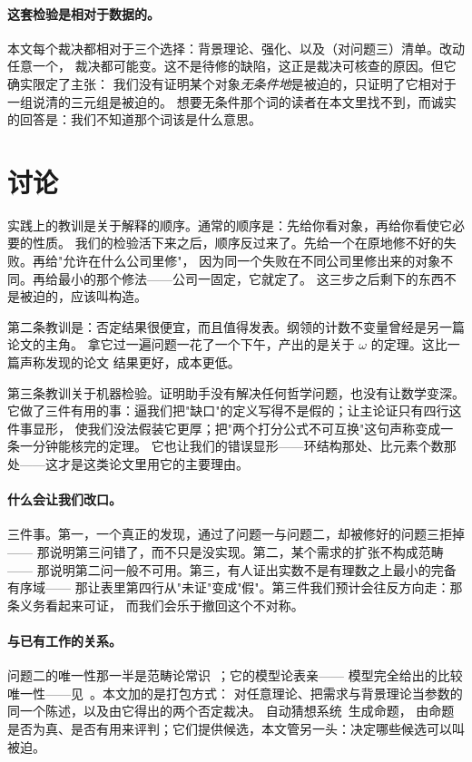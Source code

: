 \documentclass[aps,prd,preprint,superscriptaddress,amsmath,amssymb]{revtex4-2}
\begin{document}
\paragraph{这套检验是相对于数据的。}
本文每个裁决都相对于三个选择：背景理论、强化、以及（对问题三）清单。改动任意一个，
裁决都可能变。这不是待修的缺陷，这正是裁决可核查的原因。但它确实限定了主张：
我们没有证明某个对象\emph{无条件地}是被迫的，只证明了它相对于一组说清的三元组是被迫的。
想要无条件那个词的读者在本文里找不到，而诚实的回答是：我们不知道那个词该是什么意思。

\section{讨论}
\label{sec:discussion}

实践上的教训是关于解释的顺序。通常的顺序是：先给你看对象，再给你看使它必要的性质。
我们的检验活下来之后，顺序反过来了。先给一个在原地修不好的失败。再给"允许在什么公司里修"，
因为同一个失败在不同公司里修出来的对象不同。再给最小的那个修法——公司一固定，它就定了。
这三步之后剩下的东西不是被迫的，应该叫构造。

第二条教训是：否定结果很便宜，而且值得发表。纲领的计数不变量曾经是另一篇论文的主角。
拿它过一遍问题一花了一个下午，产出的是关于 $\omega$ 的定理。这比一篇声称发现的论文
结果更好，成本更低。

第三条教训关于机器检验。证明助手没有解决任何哲学问题，也没有让数学变深。
它做了三件有用的事：逼我们把"缺口"的定义写得不是假的；让主论证只有四行这件事显形，
使我们没法假装它更厚；把"两个打分公式不可互换"这句声称变成一条一分钟能核完的定理。
它也让我们的错误显形——环结构那处、比元素个数那处——这才是这类论文里用它的主要理由。

\paragraph{什么会让我们改口。}
三件事。第一，一个真正的发现，通过了问题一与问题二，却被修好的问题三拒掉——
那说明第三问错了，而不只是没实现。第二，某个需求的扩张不构成范畴——
那说明第二问一般不可用。第三，有人证出实数不是有理数之上最小的完备有序域——
那让表里第四行从"未证"变成"假"。第三件我们预计会往反方向走：那条义务看起来可证，
而我们会乐于撤回这个不对称。

\paragraph{与已有工作的关系。}
问题二的唯一性那一半是范畴论常识~\cite{MacLane1971}；它的模型论表亲——
模型完全给出的比较唯一性——见~\cite{EklofSabbagh1971}。本文加的是打包方式：
对任意理论、把需求与背景理论当参数的同一个陈述，以及由它得出的两个否定裁决。
自动猜想系统~\cite{lenat1976,davies2021,raayoni2021,romera2024}生成命题，
由命题是否为真、是否有用来评判；它们提供候选，本文管另一头：决定哪些候选可以叫被迫。
\end{document}
